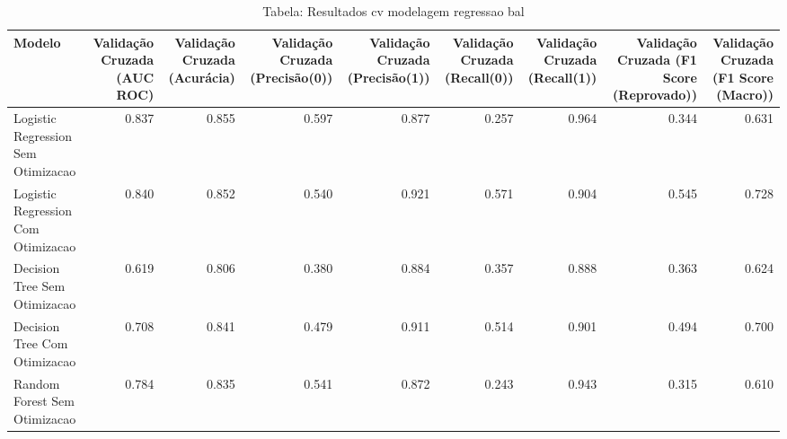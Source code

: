 \begin{table}[H] %
    \centering
    \caption{Tabela: Resultados cv modelagem regressao bal}
    \label{tab:resultados_cv_modelagem_regressao_bal}
    \renewcommand{\arraystretch}{1.25} %
    \begin{adjustwidth}{ -1in }{ -1in } %
    \centering %
    \small %
    \begin{tabular}{lrrrrrrrr}
\toprule
                            Modelo &  Validação Cruzada (AUC ROC) &  Validação Cruzada (Acurácia) &  Validação Cruzada (Precisão(0)) &  Validação Cruzada (Precisão(1)) &  Validação Cruzada (Recall(0)) &  Validação Cruzada (Recall(1)) &  Validação Cruzada (F1 Score (Reprovado)) &  Validação Cruzada (F1 Score (Macro)) \\
\midrule
Logistic Regression Sem Otimizacao &                        0.837 &                         0.855 &                            0.597 &                            0.877 &                          0.257 &                          0.964 &                                     0.344 &                                 0.631 \\
Logistic Regression Com Otimizacao &                        0.840 &                         0.852 &                            0.540 &                            0.921 &                          0.571 &                          0.904 &                                     0.545 &                                 0.728 \\
      Decision Tree Sem Otimizacao &                        0.619 &                         0.806 &                            0.380 &                            0.884 &                          0.357 &                          0.888 &                                     0.363 &                                 0.624 \\
      Decision Tree Com Otimizacao &                        0.708 &                         0.841 &                            0.479 &                            0.911 &                          0.514 &                          0.901 &                                     0.494 &                                 0.700 \\
      Random Forest Sem Otimizacao &                        0.784 &                         0.835 &                            0.541 &                            0.872 &                          0.243 &                          0.943 &                                     0.315 &                                 0.610 \\

\end{tabular}
\end{adjustwidth}
\end{table}
